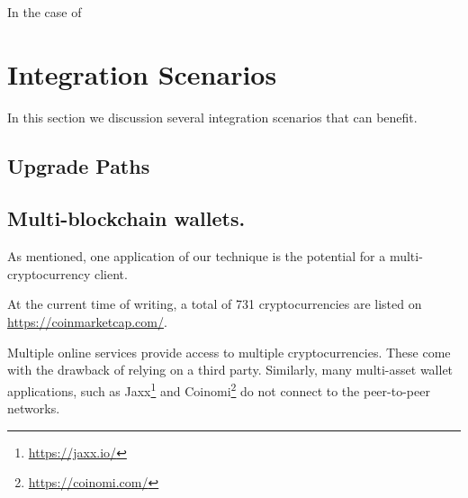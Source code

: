 In the case of 


\section{Integration Scenarios}

In this section we discussion several integration scenarios that can benefit.

\subsection{Upgrade Paths}



\subsection{Multi-blockchain wallets.}
As mentioned, one application of our technique is the potential for a multi-cryptocurrency client.

At the current time of writing, a total of 731 cryptocurrencies are listed on 
\url{https://coinmarketcap.com/}.


Multiple online services provide access to multiple cryptocurrencies. These come with the drawback of relying on a third party.
Similarly, many multi-asset wallet applications, such as Jaxx\footnote{\url{https://jaxx.io/}} and Coinomi\footnote{\url{https://coinomi.com/}} do not connect to the peer-to-peer networks.

